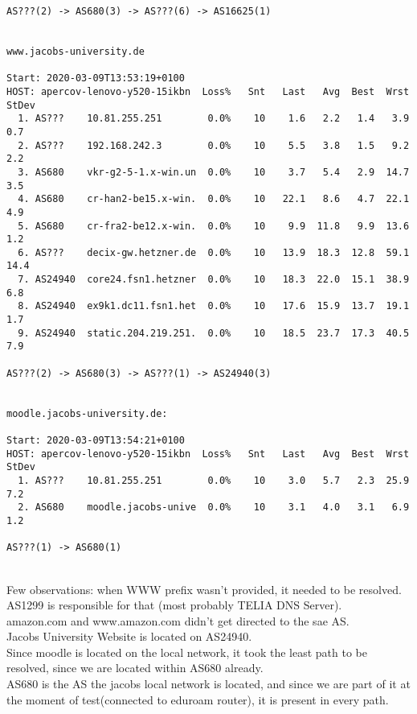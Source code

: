 \documentclass[a4paper]{article}
\begin{document}
\begin{verbatim}
AS???(2) -> AS680(3) -> AS???(6) -> AS16625(1)


www.jacobs-university.de

Start: 2020-03-09T13:53:19+0100
HOST: apercov-lenovo-y520-15ikbn  Loss%   Snt   Last   Avg  Best  Wrst StDev
  1. AS???    10.81.255.251        0.0%    10    1.6   2.2   1.4   3.9   0.7
  2. AS???    192.168.242.3        0.0%    10    5.5   3.8   1.5   9.2   2.2
  3. AS680    vkr-g2-5-1.x-win.un  0.0%    10    3.7   5.4   2.9  14.7   3.5
  4. AS680    cr-han2-be15.x-win.  0.0%    10   22.1   8.6   4.7  22.1   4.9
  5. AS680    cr-fra2-be12.x-win.  0.0%    10    9.9  11.8   9.9  13.6   1.2
  6. AS???    decix-gw.hetzner.de  0.0%    10   13.9  18.3  12.8  59.1  14.4
  7. AS24940  core24.fsn1.hetzner  0.0%    10   18.3  22.0  15.1  38.9   6.8
  8. AS24940  ex9k1.dc11.fsn1.het  0.0%    10   17.6  15.9  13.7  19.1   1.7
  9. AS24940  static.204.219.251.  0.0%    10   18.5  23.7  17.3  40.5   7.9

AS???(2) -> AS680(3) -> AS???(1) -> AS24940(3) 


moodle.jacobs-university.de:

Start: 2020-03-09T13:54:21+0100
HOST: apercov-lenovo-y520-15ikbn  Loss%   Snt   Last   Avg  Best  Wrst StDev
  1. AS???    10.81.255.251        0.0%    10    3.0   5.7   2.3  25.9   7.2
  2. AS680    moodle.jacobs-unive  0.0%    10    3.1   4.0   3.1   6.9   1.2

AS???(1) -> AS680(1)

\end{verbatim}\\
Few observations: when WWW prefix wasn't provided, it needed to be resolved. AS1299 is responsible for that (most probably TELIA DNS Server).\\
amazon.com and www.amazon.com didn't get directed to the sae AS.
\\
Jacobs University Website is located on AS24940.
\\
Since moodle is located on the local network, it took the least path to be resolved, since we are located within AS680 already.
\\
AS680 is the AS the jacobs local network is located, and since we are part of it at the moment of test(connected to eduroam router), it is present in every path.
\\
\end{document}
